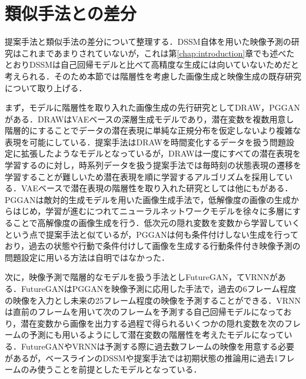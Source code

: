 \section{類似手法との差分}
提案手法と類似手法の差分について整理する．DSSM自体を用いた映像予測の研究はこれまであまりされていないが，これは第\ref{chap:introduction}章でも述べたとおりDSSMは自己回帰モデルと比べて高精度な生成には向いていないためだと考えられる．そのため本節では階層性を考慮した画像生成と映像生成の既存研究について取り上げる．

まず，モデルに階層性を取り入れた画像生成の先行研究としてDRAW\cite{gregor2015draw}，PGGAN\cite{karras2017progressive}がある．DRAWはVAEベースの深層生成モデルであり，潜在変数を複数用意し階層的にすることでデータの潜在表現に単純な正規分布を仮定しないより複雑な表現を可能にしている．提案手法はDRAWを時間変化するデータを扱う問題設定に拡張したようなモデルとなっているが，DRAWは一度にすべての潜在表現を学習するのに対し，時系列データを扱う提案手法では毎時刻の状態表現の遷移を学習することが難しいため潜在表現を順に学習するアルゴリズムを採用している．VAEベースで潜在表現の階層性を取り入れた研究としては他にも\cite{snderby2016ladder}\cite{zhao2017learning}\cite{maale2019biva}がある．PGGANは敵対的生成モデルを用いた画像生成手法で，低解像度の画像の生成からはじめ，学習が進むにつれてニューラルネットワークモデルを徐々に多層にすることで高解像度の画像生成を行う．低次元の隠れ変数を変数から学習していくという点で提案手法と似ているが，PGGANは何も条件付けしない生成を行っており，過去の状態や行動で条件付けして画像を生成する行動条件付き映像予測の問題設定に用いる方法は自明ではなかった．

次に，映像予測で階層的なモデルを扱う手法としFutureGAN\cite{Aigner_2019}，てVRNN\cite{castrejon2019improved}がある．FutureGANはPGGANを映像予測に応用した手法で，過去の6フレーム程度の映像を入力とし未来の25フレーム程度の映像を予測することができる．VRNNは直前のフレームを用いて次のフレームを予測する自己回帰モデルになっており，潜在変数から画像を出力する過程で得られるいくつかの隠れ変数を次のフレームの予測にも用いるようにして潜在変数の階層性を考えたモデルになっている．FutureGANやVRNNは予測する際に過去数フレームの映像を用意する必要があるが，ベースラインのDSSMや提案手法では初期状態の推論用に過去1フレームのみ使うことを前提としたモデルとなっている．



